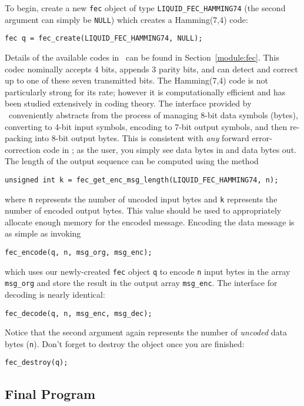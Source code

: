 To begin, create a new {\tt fec} object of type {\tt LIQUID\_FEC\_HAMMING74}
(the second argument can simply be {\tt NULL})
which creates a Hamming(7,4) code:
%
\begin{Verbatim}[fontsize=\small]
    fec q = fec_create(LIQUID_FEC_HAMMING74, NULL);
\end{Verbatim}
%
Details of the available codes in \liquid\ can be found in
Section~\ref{module:fec}.
This codec nominally accepts 4 bits, appends 3 parity bits, and can
detect and correct up to one of these seven transmitted bits.
The Hamming(7,4) code is not particularly strong for its rate;
however it is computationally efficient and has been studied extensively
in coding theory.
The interface provided by \liquid\ conveniently abstracts from the
process of managing 8-bit data symbols (bytes), converting to 4-bit
input symbols, encoding to 7-bit output symbols, and then re-packing
into 8-bit output bytes.
This is consistent with {\em any} forward error-correction code in
\liquid;
as the user, you simply see data bytes in and data bytes out.
The length of the output sequence can be computed using the method
%
\begin{Verbatim}[fontsize=\small]
    unsigned int k = fec_get_enc_msg_length(LIQUID_FEC_HAMMING74, n);
\end{Verbatim}
%
where {\tt n} represents the number of uncoded input bytes
and   {\tt k} represents the number of encoded output bytes.
This value should be used to appropriately allocate enough memory for
the encoded message.
%
Encoding the data message is as simple as invoking
%
\begin{Verbatim}[fontsize=\small]
    fec_encode(q, n, msg_org, msg_enc);
\end{Verbatim}
%
which uses our newly-created {\tt fec} object {\tt q} to encode {\tt n}
input bytes in the array {\tt msg\_org} and store the result in the
output array {\tt msg\_enc}.
The interface for decoding is nearly identical:
%
\begin{Verbatim}[fontsize=\small]
    fec_decode(q, n, msg_enc, msg_dec);
\end{Verbatim}
%
Notice that the second argument again represents the number of
{\em uncoded} data bytes ({\tt n}).
Don't forget to destroy the object once you are finished:
%
\begin{Verbatim}[fontsize=\small]
    fec_destroy(q);
\end{Verbatim}
%


\subsection{Final Program}
\label{tutorial:fec:completed}

